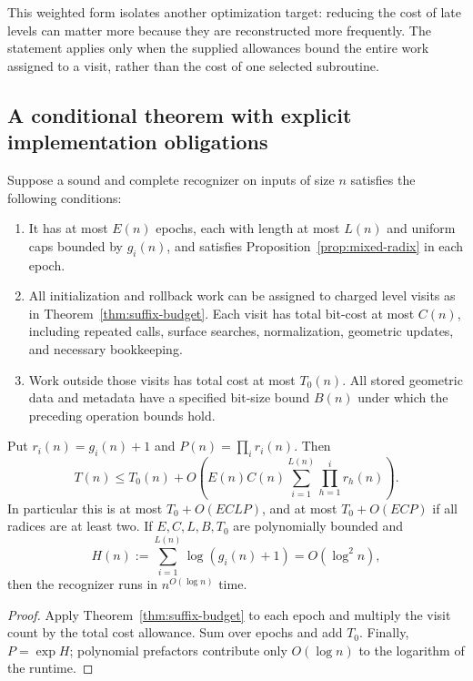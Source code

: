 This weighted form isolates another optimization target: reducing the cost of
late levels can matter more because they are reconstructed more frequently.
The statement applies only when the supplied allowances bound the entire
work assigned to a visit, rather than the cost of one selected subroutine.

\subsection{A conditional theorem with explicit implementation obligations}

\begin{theorem}
\label{thm:conditional-qp}
Suppose a sound and complete recognizer on inputs of size $n$ satisfies the
following conditions:
\begin{enumerate}[label=(\roman*)]
\item It has at most $E(n)$ epochs, each with length at most $L(n)$ and
uniform caps bounded by $g_i(n)$, and satisfies
Proposition~\ref{prop:mixed-radix} in each epoch.
\item All initialization and rollback work can be assigned to charged level
visits as in Theorem~\ref{thm:suffix-budget}.  Each visit has total bit-cost
at most $C(n)$, including repeated calls, surface searches, normalization,
geometric updates, and necessary bookkeeping.
\item Work outside those visits has total cost at most $T_0(n)$.  All stored
geometric data and metadata have a specified bit-size bound $B(n)$ under
which the preceding operation bounds hold.
\end{enumerate}
Put $r_i(n)=g_i(n)+1$ and $P(n)=\prod_i r_i(n)$.  Then
\begin{equation}
 T(n)\leq T_0(n)+O\!\left(E(n)C(n)\sum_{i=1}^{L(n)}
                       \prod_{h=1}^i r_h(n)\right).
 \label{eq:conditional-runtime}
\end{equation}
In particular this is at most $T_0+O(ECLP)$, and at most
$T_0+O(ECP)$ if all radices are at least two.  If $E,C,L,B,T_0$ are
polynomially bounded and
\begin{equation}
 H(n):=\sum_{i=1}^{L(n)}\log(g_i(n)+1)=O(\log^2 n),
 \label{eq:entropy-contract}
\end{equation}
then the recognizer runs in $n^{O(\log n)}$ time.
\end{theorem}

\begin{proof}
Apply Theorem~\ref{thm:suffix-budget} to each epoch and multiply the visit
count by the total cost allowance.  Sum over epochs and add $T_0$.  Finally,
$P=\exp H$; polynomial prefactors contribute only $O(\log n)$ to the
logarithm of the runtime.
\end{proof}

